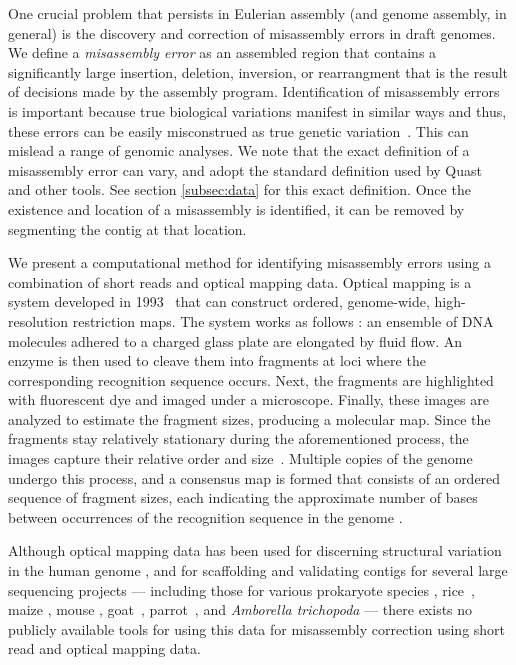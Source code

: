 \documentclass[doctor]{thesis}
\begin{document}
One crucial problem that persists in Eulerian assembly (and genome assembly, in general) is the discovery and correction of misassembly errors in draft genomes.  
We define a {\em misassembly error} as an assembled region that contains a significantly large insertion, deletion, inversion, or rearrangment that is the result of decisions made by the assembly program.  Identification of misassembly errors is important because true biological variations manifest in similar ways and thus, these errors can be easily misconstrued as true genetic variation~\cite{salzberg}. This can mislead a range of genomic analyses.  
We note that the exact definition of a misassembly error can vary, and adopt the standard definition used by Quast~\cite{quast} and other tools.  See section \ref{subsec:data} for this exact definition.  
Once the existence and 
location of a misassembly 
is identified, 
it
can be removed by segmenting the contig at that location.

   

We present a computational method for identifying misassembly errors using a combination of short reads and optical mapping data.   Optical mapping is a system developed in 1993~\cite{schwartz93} that can construct ordered, genome-wide, high-resolution restriction maps.  The system works as follows \cite{ORMenc,microfluidic}: an ensemble of DNA molecules adhered to a charged glass plate are elongated by fluid flow.   An enzyme is then used to cleave them into fragments at loci where the corresponding recognition sequence occurs. Next, the fragments are highlighted with fluorescent dye and imaged under a microscope. Finally, these images are analyzed to estimate the fragment sizes, producing a molecular map. Since the fragments stay relatively stationary during the aforementioned process, the images capture their relative order and size~\cite{Neely11}.   Multiple copies of the genome undergo this process, and a consensus map is formed that consists of an ordered sequence of fragment sizes, each indicating the approximate number of bases between occurrences of the recognition sequence in the genome \cite{Anantharaman01}.  

Although optical mapping data has been used for discerning structural variation in the human genome  \cite{teague}, and for scaffolding and validating contigs for several large sequencing projects --- including those for various prokaryote species \cite{reslewic,zhou,zhou2}, rice~\cite{RICE}, maize \cite{Zhou09}, mouse \cite{church}, goat~\cite{GOAT}, parrot~\cite{gigadb}, and {\em Amborella trichopoda} \cite{amborella} --- there exists no publicly available tools for using this data for misassembly correction using short read and optical mapping data.
\end{document}
